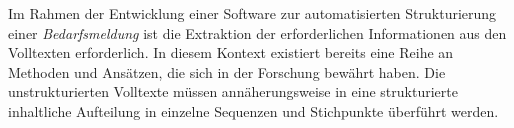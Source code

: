 Im Rahmen der Entwicklung einer Software zur automatisierten Strukturierung einer \emph{Bedarfsmeldung} ist die Extraktion der erforderlichen Informationen aus den Volltexten erforderlich. In diesem Kontext existiert bereits eine Reihe an Methoden und Ansätzen, die sich in der Forschung bewährt haben. Die unstrukturierten Volltexte müssen annäherungsweise in eine strukturierte inhaltliche Aufteilung in einzelne Sequenzen und Stichpunkte überführt werden.\\












